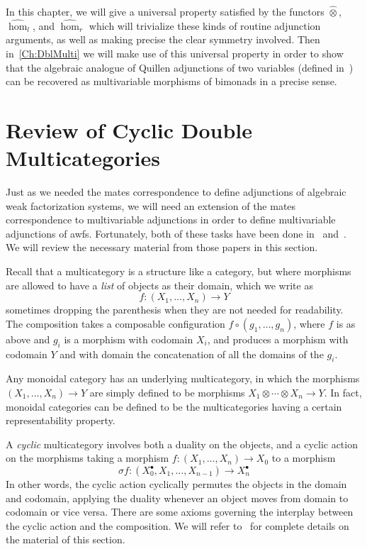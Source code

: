 In this chapter, we will give a universal property satisfied by the functors $\hat{\otimes}$, $\hat{\hom}_l$, and $\hat{\hom}_r$ which will trivialize these kinds of routine adjunction arguments, as well as making precise the clear symmetry involved. Then in~\cref{Ch:DblMulti} we will make use of this universal property in order to show that the algebraic analogue of Quillen adjunctions of two variables (defined in~\cite{riehl:nwfs-monoidal}) can be recovered as multivariable morphisms of bimonads in a precise sense.

\section{Review of Cyclic Double Multicategories}

Just as we needed the mates correspondence to define adjunctions of algebraic weak factorization systems, we will need an extension of the mates correspondence to multivariable adjunctions in order to define multivariable adjunctions of awfs. Fortunately, both of these tasks have been done in~\cite{riehl:nwfs-monoidal} and~\cite{cgr:mates}. We will review the necessary material from those papers in this section.

Recall that a multicategory is a structure like a category, but where morphisms are allowed to have a \emph{list} of objects as their domain, which we write as
\[
	f\colon (X_1,\dots,X_n) \to Y
\]
sometimes dropping the parenthesis when they are not needed for readability. The composition takes a composable configuration $f\circ(g_1,\dots,g_n)$, where $f$ is as above and $g_i$ is a morphism with codomain $X_i$, and produces a morphism with codomain $Y$ and with domain the concatenation of all the domains of the $g_i$.

\begin{example}
	Any monoidal category has an underlying multicategory, in which the morphisms $(X_1,\dots,X_n) \to Y$ are simply defined to be morphisms $X_1\otimes\cdots\otimes X_n\to Y$. In fact, monoidal categories can be defined to be the multicategories having a certain representability property. 
\end{example}

A \emph{cyclic} multicategory involves both a duality on the objects, and a cyclic action on the morphisms taking a morphism $f\colon (X_1,\dots,X_n) \to X_0$ to a morphism
\[
	 \sigma f\colon(X_0^{\bullet},X_1,\dots,X_{n-1})\to X_n^{\bullet}
\]
In other words, the cyclic action cyclically permutes the objects in the domain and codomain, applying the duality whenever an object moves from domain to codomain or vice versa. There are some axioms governing the interplay between the cyclic action and the composition. We will refer to~\cite{cgr:mates} for complete details on the material of this section.

